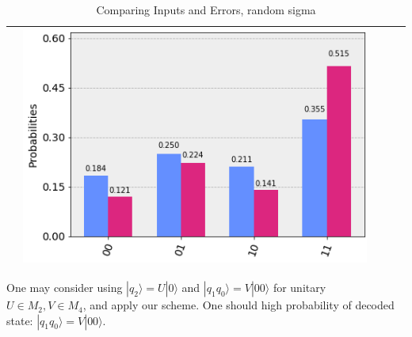\documentclass[11pt]{article}
\def\ra{{\rangle}}
\begin{document}
\begin{table}[h!]
\begin{tabular}{| c | c | c | c | c | }
\begin{minipage}{.215\textwidth}
    \end{minipage}
    &\begin{minipage}{.215\textwidth}
    \includegraphics[width=\linewidth]{img/rand_qecc3_I11.png}
    \end{minipage}
    \\ \hline
\end{tabular}
\caption{Comparing Inputs and Errors, random sigma}\label{tbl:sigR}
\end{table}


One may consider using $|q_2\ra = U|0\ra$ and  $|q_1q_0\ra = V|00\ra$
for unitary $U \in M_2, V \in M_4$, and apply our scheme.
One should high probability of decoded state: $|q_1q_0\ra = V|00\ra$.
\end{document}
